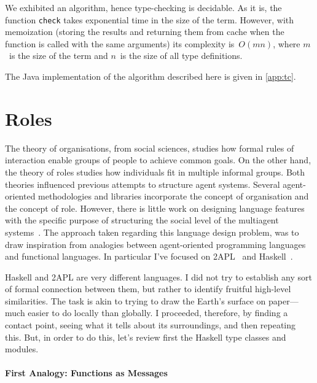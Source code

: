 \documentclass[a4paper,12pt,oneside,fleqn]{book} %
\newcommand{\rg}[1]{\marginpar{\tiny\raggedright\textcolor{blue}{\bf rg:} #1}}
\newcommand{\todo}[1]{[\textcolor{red}{TODO}: #1]}
\renewcommand{\rg}{}
\begin{document}
We exhibited an algorithm, hence type-checking is decidable. As it is, the
function \verb|check| takes exponential time in the size of the term.
However, with memoization (storing the results and returning them from
cache when the function is called with the same arguments) its complexity
is~$O(mn)$, where $m$~is the size of the term and $n$~is the size of all
type definitions.

The Java implementation of the algorithm described here
  is given in \autoref{app:tc}.

\section{Roles}\label{sec:roles} %
The theory of organisations, from social sciences, studies how formal rules
of interaction enable groups of people to achieve common goals. On the
other hand, the theory of roles studies how individuals fit in multiple
informal groups. Both theories influenced previous attempts to structure agent
systems. Several agent-oriented methodologies and libraries incorporate the
concept of organisation and the concept of role.  However, there is little
work on designing language features with the specific purpose of
structuring the social level of the multiagent
systems~\cite{collier2005,DBLP:journals/entcs/BaldoniBT06,DBLP:conf/oopsla/RicciS11}.
The approach taken regarding this language design problem, was to draw
inspiration from analogies between agent-oriented programming languages and
functional languages. In particular I've focused on
2APL~\cite{DBLP:journals/aamas/Dastani08} and Haskell~\cite{web:haskell}.

Haskell and 2APL are very different languages. I did not try to establish
any sort of formal connection between them, but rather to identify fruitful
high-level similarities. The task is akin to trying to draw the Earth's
surface on paper---much easier to do locally than globally. I proceeded,
therefore, by finding a contact point, seeing what it tells about its
surroundings, and then repeating this. But, in order to do this, let's review
first the Haskell type classes and modules.


\paragraph{First Analogy: Functions as Messages} %
\end{document}
